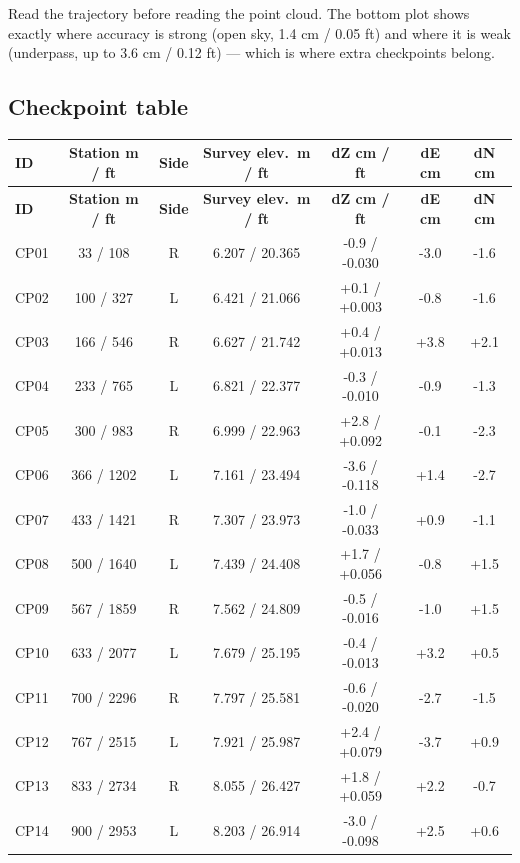 \begin{bigidea}
Read the trajectory before reading the point cloud. The bottom plot shows exactly where accuracy is strong (open sky, 1.4 cm / 0.05 ft) and where it is weak (underpass, up to 3.6 cm / 0.12 ft) --- which is where extra checkpoints belong.
\end{bigidea}

\subsection*{Checkpoint table}
{\footnotesize
\setlength{\tabcolsep}{4pt}
\renewcommand{\arraystretch}{1.05}
\begin{longtable}{lcccccc}\toprule
\textbf{ID} & \textbf{Station m / ft} & \textbf{Side} & \textbf{Survey elev.\ m / ft} & \textbf{dZ cm / ft} & \textbf{dE cm} & \textbf{dN cm}\\\midrule
\endfirsthead
\textbf{ID} & \textbf{Station m / ft} & \textbf{Side} & \textbf{Survey elev.\ m / ft} & \textbf{dZ cm / ft} & \textbf{dE cm} & \textbf{dN cm}\\\midrule
\endhead
CP01 & 33 / 108 & R & 6.207 / 20.365 & -0.9 / -0.030 & -3.0 & -1.6\\
CP02 & 100 / 327 & L & 6.421 / 21.066 & +0.1 / +0.003 & -0.8 & -1.6\\
CP03 & 166 / 546 & R & 6.627 / 21.742 & +0.4 / +0.013 & +3.8 & +2.1\\
CP04 & 233 / 765 & L & 6.821 / 22.377 & -0.3 / -0.010 & -0.9 & -1.3\\
CP05 & 300 / 983 & R & 6.999 / 22.963 & +2.8 / +0.092 & -0.1 & -2.3\\
CP06 & 366 / 1202 & L & 7.161 / 23.494 & -3.6 / -0.118 & +1.4 & -2.7\\
CP07 & 433 / 1421 & R & 7.307 / 23.973 & -1.0 / -0.033 & +0.9 & -1.1\\
CP08 & 500 / 1640 & L & 7.439 / 24.408 & +1.7 / +0.056 & -0.8 & +1.5\\
CP09 & 567 / 1859 & R & 7.562 / 24.809 & -0.5 / -0.016 & -1.0 & +1.5\\
CP10 & 633 / 2077 & L & 7.679 / 25.195 & -0.4 / -0.013 & +3.2 & +0.5\\
CP11 & 700 / 2296 & R & 7.797 / 25.581 & -0.6 / -0.020 & -2.7 & -1.5\\
CP12 & 767 / 2515 & L & 7.921 / 25.987 & +2.4 / +0.079 & -3.7 & +0.9\\
CP13 & 833 / 2734 & R & 8.055 / 26.427 & +1.8 / +0.059 & +2.2 & -0.7\\
CP14 & 900 / 2953 & L & 8.203 / 26.914 & -3.0 / -0.098 & +2.5 & +0.6\\

\end{longtable}}
